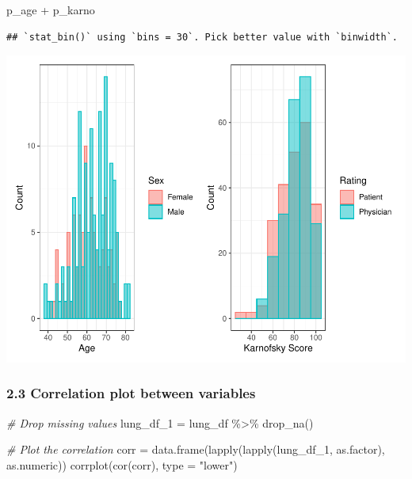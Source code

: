 \documentclass[
]{article}
\newenvironment{Shaded}{\begin{snugshade}}{\end{snugshade}}
\newcommand{\AttributeTok}[1]{\textcolor[rgb]{0.77,0.63,0.00}{#1}}
\newcommand{\CommentTok}[1]{\textcolor[rgb]{0.56,0.35,0.01}{\textit{#1}}}
\newcommand{\FunctionTok}[1]{\textcolor[rgb]{0.00,0.00,0.00}{#1}}
\newcommand{\NormalTok}[1]{#1}
\newcommand{\OtherTok}[1]{\textcolor[rgb]{0.56,0.35,0.01}{#1}}
\newcommand{\SpecialCharTok}[1]{\textcolor[rgb]{0.00,0.00,0.00}{#1}}
\newcommand{\StringTok}[1]{\textcolor[rgb]{0.31,0.60,0.02}{#1}}
\begin{document}
\begin{Shaded}
\begin{Highlighting}[]
\NormalTok{p\_age }\SpecialCharTok{+}\NormalTok{ p\_karno}
\end{Highlighting}
\end{Shaded}

\begin{verbatim}
## `stat_bin()` using `bins = 30`. Pick better value with `binwidth`.
\end{verbatim}

\includegraphics{final_project_files/figure-latex/unnamed-chunk-6-3.pdf}

\hypertarget{correlation-plot-between-variables}{%
\subsubsection{2.3 Correlation plot between
variables}\label{correlation-plot-between-variables}}

\begin{Shaded}
\begin{Highlighting}[]
\CommentTok{\# Drop missing values}
\NormalTok{lung\_df\_1 }\OtherTok{=}\NormalTok{ lung\_df }\SpecialCharTok{\%\textgreater{}\%}
  \FunctionTok{drop\_na}\NormalTok{()}

\CommentTok{\# Plot the correlation}
\NormalTok{corr }\OtherTok{=} \FunctionTok{data.frame}\NormalTok{(}\FunctionTok{lapply}\NormalTok{(}\FunctionTok{lapply}\NormalTok{(lung\_df\_1, as.factor), as.numeric))}
\FunctionTok{corrplot}\NormalTok{(}\FunctionTok{cor}\NormalTok{(corr), }\AttributeTok{type =} \StringTok{"lower"}\NormalTok{)}
\end{Highlighting}
\end{Shaded}
\end{document}
